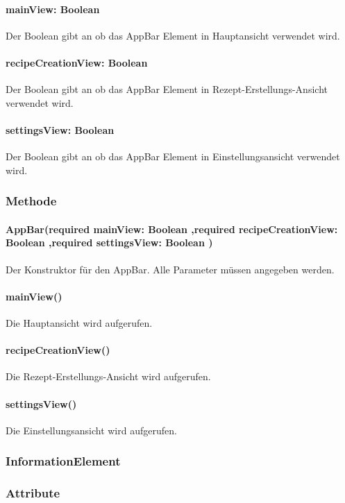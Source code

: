 \documentclass[parskip=full]{scrartcl}
\begin{document}
            \paragraph*{mainView: Boolean} Der Boolean gibt an ob das AppBar Element in Hauptansicht verwendet wird.
            \paragraph*{recipeCreationView: Boolean} Der Boolean gibt an ob das AppBar Element in Rezept-Erstellungs-Ansicht verwendet wird.
            \paragraph*{settingsView: Boolean} Der Boolean gibt an ob das AppBar Element in Einstellungsansicht verwendet wird.

        \subsubsection*{Methode}
            \paragraph*{AppBar(required mainView: Boolean ,required recipeCreationView: Boolean ,required settingsView: Boolean )} Der Konstruktor für den AppBar. Alle Parameter müssen angegeben werden. 
            \paragraph*{mainView()} Die Hauptansicht wird aufgerufen.
            \paragraph*{recipeCreationView()} Die Rezept-Erstellungs-Ansicht wird aufgerufen.
            \paragraph*{settingsView()} Die Einstellungsansicht wird aufgerufen.


    \subsubsection{InformationElement} \label{sec:InformationElement}
        \subsubsection*{Attribute}
\end{document}
